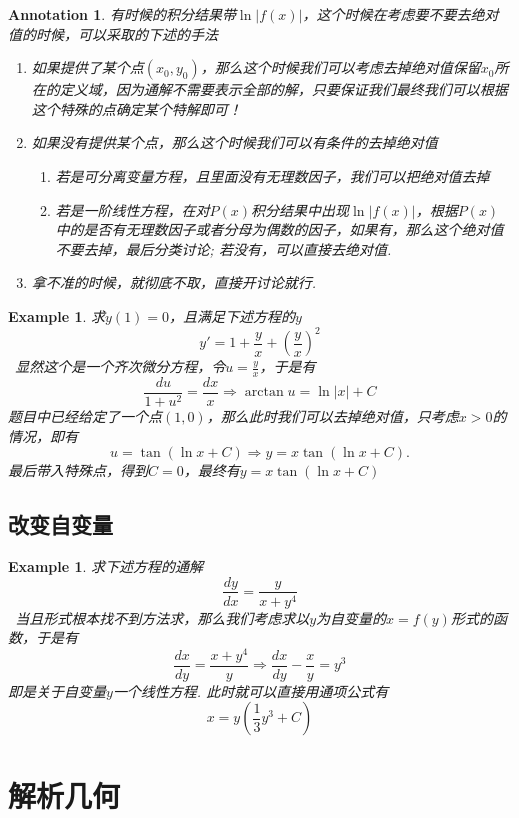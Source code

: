 \documentclass{article}
\newtheorem{example}[theorem]{Example}
\newtheorem{annotation}[theorem]{Annotation}
\newcommand{\hints}{{\color{blue} \text{hints}}}
\begin{document}
\begin{annotation}
\rm 有时候的积分结果带$\ln|f(x)|$，这个时候在考虑要不要去绝对值的时候，可以采取的下述的手法
\begin{enumerate}
	\item 如果提供了某个点$(x_0,y_0)$，那么这个时候我们可以考虑去掉绝对值保留$x_0$所在的定义域，因为通解不需要表示全部的解，只要保证我们最终我们可以根据这个特殊的点确定某个特解即可！
	\item 如果没有提供某个点，那么这个时候我们可以有条件的去掉绝对值
	\begin{enumerate}
		\item 若是可分离变量方程，且里面没有无理数因子，我们可以把绝对值去掉
		\item 若是一阶线性方程，在对$P(x)$积分结果中出现$\ln|f(x)|$，根据$P(x)$中的是否有无理数因子或者分母为偶数的因子，如果有，那么这个绝对值不要去掉，最后分类讨论; 若没有，可以直接去绝对值. 
	\end{enumerate}
	\item 拿不准的时候，就彻底不取，直接开讨论就行. 
\end{enumerate}	
\end{annotation}

\begin{example}
\rm 求$y(1)=0$，且满足下述方程的$y$
$$
y'  = 1+\frac{y}{x} + \left( \frac{y}{x} \right)^2
$$
\hints\ 显然这个是一个齐次微分方程，令$u = \frac{y}{x}$，于是有
$$
\frac{du}{1+u^2} = \frac{dx}{x} \Rightarrow \arctan u = \ln |x|+C
$$
题目中已经给定了一个点$(1,0)$，那么此时我们可以去掉绝对值，只考虑$x > 0$的情况，即有
$$
u = \tan (\ln x + C) \Rightarrow y = x\tan (\ln x + C).
$$
最后带入特殊点，得到$C = 0$，最终有$y = x\tan (\ln x + C)$
\end{example}


\subsection{改变自变量}

\begin{example}
\rm 求下述方程的通解
$$
\frac{dy}{dx} = \frac{y}{x+y^4}
$$
\hints\ 当且形式根本找不到方法求，那么我们考虑求以$y$为自变量的$x=f(y)$形式的函数，于是有
$$
\frac{dx}{dy} = \frac{x+y^4}{y}  \Rightarrow \frac{dx}{dy} - \frac{x}{y} = y^3
$$
即是关于自变量$y$一个线性方程. 此时就可以直接用通项公式有
$$
x= y(\frac{1}{3}y^3 + C)
$$
\end{example}

\newpage
\section{解析几何}
\end{document}
